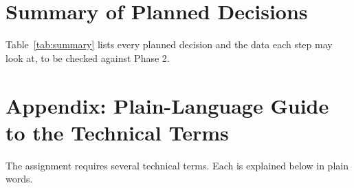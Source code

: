 \documentclass[conference,a4paper]{IEEEtran}
\begin{document}
\section{Summary of Planned Decisions}
Table~\ref{tab:summary} lists every planned decision and the data each step may look at, to be checked against Phase 2.

\FloatBarrier
\section*{Appendix: Plain-Language Guide to the Technical Terms}
\label{app:glossary}
The assignment requires several technical terms. Each is explained below in plain words.
\end{document}

